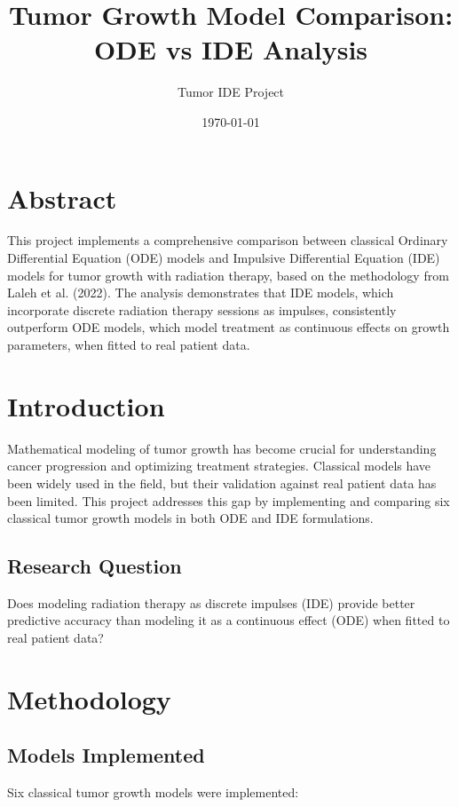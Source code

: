 \documentclass[11pt]{article}
\title{Tumor Growth Model Comparison: ODE vs IDE Analysis}
\author{Tumor IDE Project}
\date{\today}
\begin{document}
\maketitle

\section{Abstract}

This project implements a comprehensive comparison between classical Ordinary Differential Equation (ODE) models and Impulsive Differential Equation (IDE) models for tumor growth with radiation therapy, based on the methodology from Laleh et al. (2022). The analysis demonstrates that IDE models, which incorporate discrete radiation therapy sessions as impulses, consistently outperform ODE models, which model treatment as continuous effects on growth parameters, when fitted to real patient data.

\section{Introduction}

Mathematical modeling of tumor growth has become crucial for understanding cancer progression and optimizing treatment strategies. Classical models have been widely used in the field, but their validation against real patient data has been limited. This project addresses this gap by implementing and comparing six classical tumor growth models in both ODE and IDE formulations.

\subsection{Research Question}

Does modeling radiation therapy as discrete impulses (IDE) provide better predictive accuracy than modeling it as a continuous effect (ODE) when fitted to real patient data?

\section{Methodology}

\subsection{Models Implemented}

Six classical tumor growth models were implemented:
\end{document}
